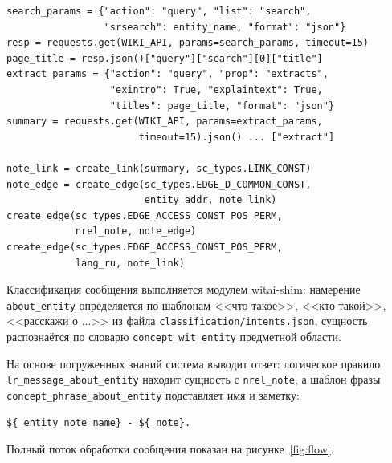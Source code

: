\begin{lstlisting}[caption={Фрагмент MusicEntityEnrichmentAgent: поиск и запись},label={lst:py},basicstyle=\footnotesize\ttfamily]
search_params = {"action": "query", "list": "search",
                 "srsearch": entity_name, "format": "json"}
resp = requests.get(WIKI_API, params=search_params, timeout=15)
page_title = resp.json()["query"]["search"][0]["title"]
extract_params = {"action": "query", "prop": "extracts",
                  "exintro": True, "explaintext": True,
                  "titles": page_title, "format": "json"}
summary = requests.get(WIKI_API, params=extract_params,
                       timeout=15).json() ... ["extract"]

note_link = create_link(summary, sc_types.LINK_CONST)
note_edge = create_edge(sc_types.EDGE_D_COMMON_CONST,
                        entity_addr, note_link)
create_edge(sc_types.EDGE_ACCESS_CONST_POS_PERM,
            nrel_note, note_edge)
create_edge(sc_types.EDGE_ACCESS_CONST_POS_PERM,
            lang_ru, note_link)
\end{lstlisting}

Классификация сообщения выполняется модулем witai-shim: намерение \texttt{about\_entity} определяется по шаблонам <<что такое>>, <<кто такой>>, <<расскажи о ...>> из файла \texttt{classification/intents.json}, сущность распознаётся по словарю \texttt{concept\_wit\_entity} предметной области.

На основе погруженных знаний система выводит ответ: логическое правило \texttt{lr\_message\_about\_entity} находит сущность с \texttt{nrel\_note}, а шаблон фразы \texttt{concept\_phrase\_about\_entity} подставляет имя и заметку:

\begin{lstlisting}[caption={Шаблон фразы ответа},label={lst:phrase},basicstyle=\footnotesize\ttfamily]
${_entity_note_name} - ${_note}.
\end{lstlisting}

Полный поток обработки сообщения показан на рисунке~\ref{fig:flow}.

